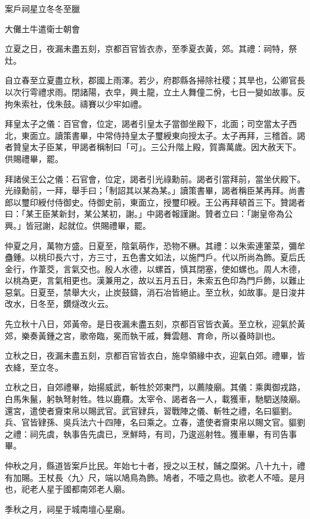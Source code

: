 
\begin{pinyinscope}
案戶祠星立冬冬至臘

大儺土牛遣衛士朝會

立夏之日，夜漏未盡五刻，京都百官皆衣赤，至季夏衣黃，郊。其禮：祠特，祭灶。

自立春至立夏盡立秋，郡國上雨澤。若少，府郡縣各掃除社稷；其旱也，公卿官長以次行雩禮求雨。閉諸陽，衣皁，興土龍，立土人舞僮二佾，七日一變如故事。反拘朱索社，伐朱鼓。禱賽以少牢如禮。

拜皇太子之儀：百官會，位定，謁者引皇太子當御坐殿下，北面；司空當太子西北，東面立。讀策書畢，中常侍持皇太子璽綬東向授太子。太子再拜，三稽首。謁者贊皇太子臣某，甲謁者稱制曰「可」。三公升階上殿，賀壽萬歲。因大赦天下。供賜禮畢，罷。

拜諸侯王公之儀：石官會，位定，謁者引光祿勳前。謁者引當拜前，當坐伏殿下。光祿勳前，一拜，舉手曰；「制詔其以某為某。」讀策書畢，謁者稱臣某再拜。尚書郎以璽印綬付侍御史。侍御史前，東面立，授璽印綬。王公再拜頓首三下。贊謁者曰：「某王臣某新封，某公某初，謝。」中謁者報謹謝。贊者立曰：「謝皇帝為公興。」皆冠謝，起就位。供賜禮畢，罷。

仲夏之月，萬物方盛。日夏至，陰氣萌作，恐物不楙。其禮：以朱索連葷菜，彌牟蠱鍾。以桃印長六寸，方三寸，五色書文如法，以施門戶。代以所尚為飾。夏后氏金行，作葦茭，言氣交也。殷人水德，以螺首，慎其閉塞，使如螺也。周人木德，以桃為更，言氣相更也。漢兼用之，故以五月五日，朱索五色印為門戶飾，以難止惡氣。日夏至，禁舉大火，止炭鼓鑄，消石冶皆絕止。至立秋，如故事。是日浚井改水，日冬至，鑽燧改火云。

先立秋十八日，郊黃帝。是日夜漏未盡五刻，京都百官皆衣黃。至立秋，迎氣於黃郊，樂奏黃鍾之宮，歌帝臨，冕而執干戚，舞雲翹、育命，所以養時訓也。

立秋之日，夜漏未盡五刻，京都百官皆衣白，施皁領緣中衣，迎氣白郊。禮畢，皆衣絳，至立冬。

立秋之日，自郊禮畢，始揚威武，斬牲於郊東門，以薦陵廟。其儀：乘輿御戎路，白馬朱鬣，躬執弩射牲。牲以鹿麛。太宰令、謁者各一人，載獲車，馳駟送陵廟。還宮，遣使者齎束帛以賜武官。武官肄兵，習戰陣之儀、斬牲之禮，名曰貙劉。兵、官皆肄孫、吳兵法六十四陣，名曰乘之。立春，遣使者齎束帛以賜文官。貙劉之禮：祠先虞，執事告先虞已，烹鮮時，有司，乃逡巡射牲。獲車畢，有司告事畢。

仲秋之月，縣道皆案戶比民。年始七十者，授之以王杖，餔之糜粥。八十九十，禮有加賜。王杖長〈九〉尺，端以鳩鳥為飾。鳩者，不噎之鳥也。欲老人不噎。是月也，祀老人星于國都南郊老人廟。

季秋之月，祠星于城南壇心星廟。


\end{pinyinscope}
